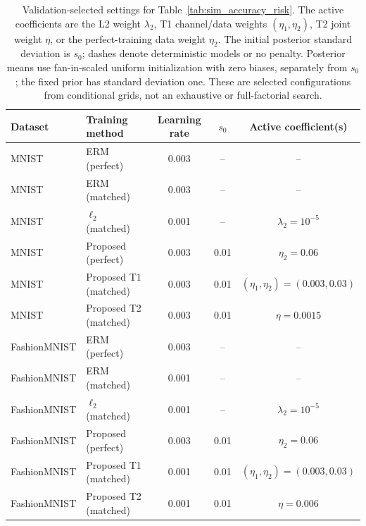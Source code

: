 \begin{table}[t]
\centering\footnotesize
\caption{Validation-selected settings for Table~\ref{tab:sim_accuracy_risk}. The active coefficients are the L2 weight $\lambda_2$, T1 channel/data weights $(\eta_1,\eta_2)$, T2 joint weight $\eta$, or the perfect-training data weight $\eta_2$. The initial posterior standard deviation is $s_0$; dashes denote deterministic models or no penalty. Posterior means use fan-in-scaled uniform initialization with zero biases, separately from $s_0$; the fixed prior has standard deviation one. These are selected configurations from conditional grids, not an exhaustive or full-factorial search.}
\label{tab:app_hyperparameters}
\setlength{\tabcolsep}{5pt}
\begin{tabular}{llccc}
\toprule
Dataset & Training method & Learning rate & $s_0$ & Active coefficient(s)\\
\midrule
MNIST & ERM (perfect) & 0.003 & -- & --\\
MNIST & ERM (matched) & 0.003 & -- & --\\
MNIST & $\ell_2$ (matched) & 0.001 & -- & $\lambda_2=10^{-5}$\\
MNIST & Proposed (perfect) & 0.003 & 0.01 & $\eta_2=0.06$\\
MNIST & Proposed T1 (matched) & 0.003 & 0.01 & $(\eta_1,\eta_2)=(0.003,0.03)$\\
MNIST & Proposed T2 (matched) & 0.003 & 0.01 & $\eta=0.0015$\\
\addlinespace
FashionMNIST & ERM (perfect) & 0.003 & -- & --\\
FashionMNIST & ERM (matched) & 0.001 & -- & --\\
FashionMNIST & $\ell_2$ (matched) & 0.001 & -- & $\lambda_2=10^{-5}$\\
FashionMNIST & Proposed (perfect) & 0.003 & 0.01 & $\eta_2=0.06$\\
FashionMNIST & Proposed T1 (matched) & 0.001 & 0.01 & $(\eta_1,\eta_2)=(0.003,0.03)$\\
FashionMNIST & Proposed T2 (matched) & 0.001 & 0.01 & $\eta=0.006$\\
\bottomrule
\end{tabular}
\end{table}
